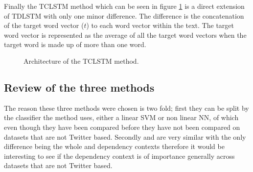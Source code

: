 Finally the TCLSTM method which can be seen in figure \ref{fig:repro_tclstm_method} is a direct extension of TDLSTM with only one minor difference. The difference is the concatenation of the target word vector ($t$) to each word vector within the text. The target word vector is represented as the average of all the target word vectors when the target word is made up of more than one word.

\begin{figure}[!ht]
    \centering
    
    \caption{Architecture of the TCLSTM method.}
    \label{fig:repro_tclstm_method}
\end{figure}

\subsection{Review of the three methods}
The reason these three methods were chosen is two fold; first they can be split by the classifier the method uses, either a linear SVM or non linear NN, of which even though they have been compared before \cite{tang-etal-2016-effective, wang-etal-2017-tdparse} they have not been compared on datasets that are not Twitter based. Secondly \citet{vo2015target} and \citet{wang-etal-2017-tdparse} are very similar with the only difference being the whole and dependency contexts therefore it would be interesting to see if the dependency context is of importance generally across datasets that are not Twitter based.


